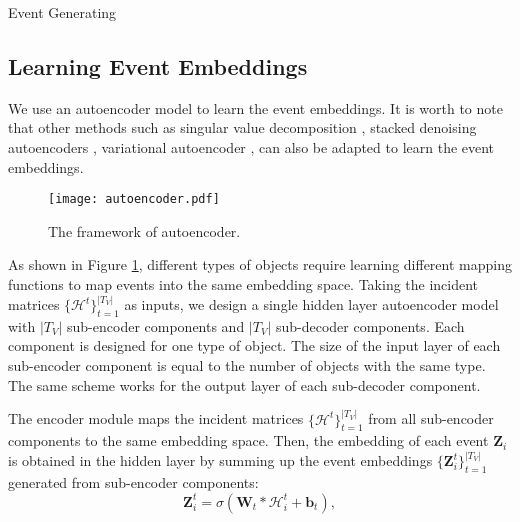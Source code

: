 \begin{algorithm}
	\DontPrintSemicolon
	\caption{Event Generating}\label{algorithm1}
\end{algorithm}


\subsection{Learning Event Embeddings}
We use an autoencoder model to learn the event embeddings. It is worth to note that other methods such as singular value decomposition \cite{golub1970singular}, stacked denoising autoencoders \cite{vincent2010stacked}, variational autoencoder \cite{doersch2016tutorial}, can also be adapted to learn the event embeddings. 

\begin{figure}
	\centering
	\texttt{[image: autoencoder.pdf]}
	\caption{{\small The framework of autoencoder.}}\label{figure5}
\end{figure}

As shown in Figure \ref{figure5}, different types of objects require learning different mapping functions to map events into the same embedding space. Taking the incident matrices $\{\mathcal{H}^t\}_{t=1}^{|T_V|}$ as inputs, we design a single hidden layer autoencoder model with $|T_V|$ sub-encoder components and $|T_V|$ sub-decoder components. Each component is designed for one type of object. The size of the input layer of each sub-encoder component is equal to the number of objects with the same type. The same scheme works for the output layer of each sub-decoder component.

The encoder module maps the incident matrices $\{\mathcal{H}^t\}_{t=1}^{|T_V|}$ from all sub-encoder components to the same embedding space. Then, the embedding of each event $\textbf{Z}_i$ is obtained in the hidden layer by summing up the event embeddings $\{\textbf{Z}_i^t\}_{t=1}^{|T_V|}$ generated from sub-encoder components:
\begin{equation}\label{equation3}
\textbf{Z}_i^t = \sigma(\textbf{W}_t*\mathcal{H}_i^t + \textbf{b}_t),
\end{equation}

